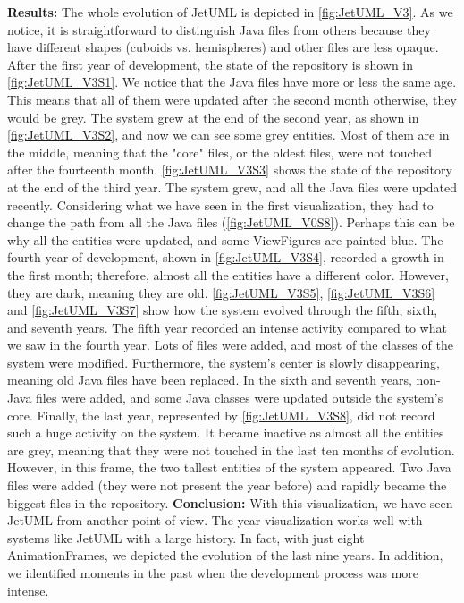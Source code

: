 \bigbreak
\noindent
\textbf{Results:}
The whole evolution of JetUML is depicted in \autoref{fig:JetUML_V3}. As we notice, it is straightforward to distinguish Java files from others because they have different shapes (cuboids vs. hemispheres)  and other files are less opaque. After the first year of development, the state of the repository is shown in \autoref{fig:JetUML_V3S1}. We notice that the Java files have more or less the same age. This means that all of them were updated after the second month otherwise, they would be grey. The system grew at the end of the second year, as shown in \autoref{fig:JetUML_V3S2}, and now we can see some grey entities. Most of them are in the middle, meaning that the "core" files, or the oldest files, were not touched after the fourteenth month.  \autoref{fig:JetUML_V3S3} shows the state of the repository at the end of the third year. The system grew, and all the Java files were updated recently. Considering what we have seen in the first visualization, they had to change the path from all the Java files (\autoref{fig:JetUML_V0S8}). Perhaps this can be why all the entities were updated, and some ViewFigures are painted blue. 
The fourth year of development, shown in  \autoref{fig:JetUML_V3S4}, recorded a growth in the first month; therefore, almost all the entities have a different color.
However, they are dark, meaning they are old. 
\autoref{fig:JetUML_V3S5},  \autoref{fig:JetUML_V3S6} and  \autoref{fig:JetUML_V3S7} show how the system evolved through the fifth, sixth, and seventh years. The fifth year recorded an intense activity compared to what we saw in the fourth year. Lots of files were added, and most of the classes of the system were modified. Furthermore, the system's center is slowly disappearing, meaning old Java files have been replaced. In the sixth and seventh years, non-Java files were added, and some Java classes were updated outside the system's core. Finally, the last year, represented by \autoref{fig:JetUML_V3S8}, did not record such a huge activity on the system. It became inactive as almost all the entities are grey, meaning that they were not touched in the last ten months of evolution. However, in this frame, the two tallest entities of the system appeared. Two Java files were added (they were not present the year before) and rapidly became the biggest files in the repository.  
\bigbreak
\noindent
\textbf{Conclusion:}
With this visualization, we have seen JetUML from another point of view. The year visualization works well with systems like JetUML with a large history. In fact, with just eight AnimationFrames, we depicted the evolution of the last nine years. In addition, we identified moments in the past when the development process was more intense. 
\bigbreak


